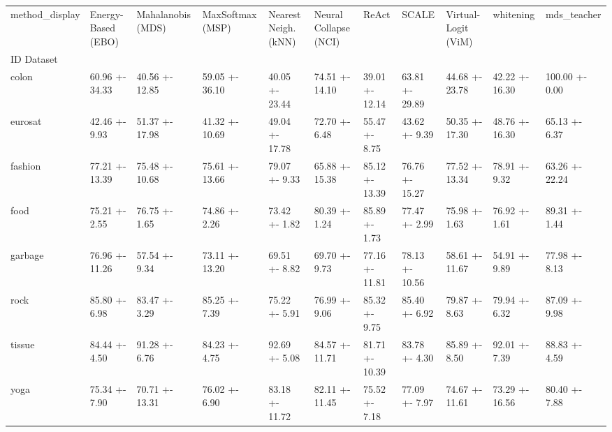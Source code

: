 \begin{tabular}{lllllllllll}
\toprule
method_display & Energy-Based (EBO) & Mahalanobis (MDS) & MaxSoftmax (MSP) & Nearest Neigh. (kNN) & Neural Collapse (NCI) & ReAct & SCALE & Virtual-Logit (ViM) & whitening & mds_teacher \\
ID Dataset &  &  &  &  &  &  &  &  &  &  \\
\midrule
colon & 60.96 +- 34.33 & 40.56 +- 12.85 & 59.05 +- 36.10 & 40.05 +- 23.44 & 74.51 +- 14.10 & 39.01 +- 12.14 & 63.81 +- 29.89 & 44.68 +- 23.78 & 42.22 +- 16.30 & 100.00 +- 0.00 \\
eurosat & 42.46 +- 9.93 & 51.37 +- 17.98 & 41.32 +- 10.69 & 49.04 +- 17.78 & 72.70 +- 6.48 & 55.47 +- 8.75 & 43.62 +- 9.39 & 50.35 +- 17.30 & 48.76 +- 16.30 & 65.13 +- 6.37 \\
fashion & 77.21 +- 13.39 & 75.48 +- 10.68 & 75.61 +- 13.66 & 79.07 +- 9.33 & 65.88 +- 15.38 & 85.12 +- 13.39 & 76.76 +- 15.27 & 77.52 +- 13.34 & 78.91 +- 9.32 & 63.26 +- 22.24 \\
food & 75.21 +- 2.55 & 76.75 +- 1.65 & 74.86 +- 2.26 & 73.42 +- 1.82 & 80.39 +- 1.24 & 85.89 +- 1.73 & 77.47 +- 2.99 & 75.98 +- 1.63 & 76.92 +- 1.61 & 89.31 +- 1.44 \\
garbage & 76.96 +- 11.26 & 57.54 +- 9.34 & 73.11 +- 13.20 & 69.51 +- 8.82 & 69.70 +- 9.73 & 77.16 +- 11.81 & 78.13 +- 10.56 & 58.61 +- 11.67 & 54.91 +- 9.89 & 77.98 +- 8.13 \\
rock & 85.80 +- 6.98 & 83.47 +- 3.29 & 85.25 +- 7.39 & 75.22 +- 5.91 & 76.99 +- 9.06 & 85.32 +- 9.75 & 85.40 +- 6.92 & 79.87 +- 8.63 & 79.94 +- 6.32 & 87.09 +- 9.98 \\
tissue & 84.44 +- 4.50 & 91.28 +- 6.76 & 84.23 +- 4.75 & 92.69 +- 5.08 & 84.57 +- 11.71 & 81.71 +- 10.39 & 83.78 +- 4.30 & 85.89 +- 8.50 & 92.01 +- 7.39 & 88.83 +- 4.59 \\
yoga & 75.34 +- 7.90 & 70.71 +- 13.31 & 76.02 +- 6.90 & 83.18 +- 11.72 & 82.11 +- 11.45 & 75.52 +- 7.18 & 77.09 +- 7.97 & 74.67 +- 11.61 & 73.29 +- 16.56 & 80.40 +- 7.88 \\
\bottomrule
\end{tabular}
